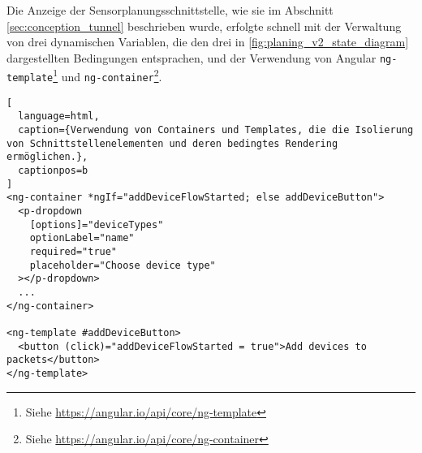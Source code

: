 Die Anzeige der Sensorplanungsschnittstelle, wie sie im Abschnitt \ref{sec:conception_tunnel} beschrieben wurde, erfolgte schnell mit der Verwaltung von drei dynamischen Variablen, die den drei in \ref{fig:planing_v2_state_diagram} dargestellten Bedingungen entsprachen, und der Verwendung von Angular \lstinline{ng-template}\footnote{Siehe \href{https://angular.io/api/core/ng-template}{https://angular.io/api/core/ng-template}} und \lstinline{ng-container}\footnote{Siehe \href{https://angular.io/api/core/ng-container}{https://angular.io/api/core/ng-container}}.

\begin{lstlisting}[
  language=html,
  caption={Verwendung von Containers und Templates, die die Isolierung von Schnittstellenelementen und deren bedingtes Rendering ermöglichen.},
  captionpos=b
]
<ng-container *ngIf="addDeviceFlowStarted; else addDeviceButton">
  <p-dropdown
    [options]="deviceTypes"
    optionLabel="name"
    required="true"
    placeholder="Choose device type"
  ></p-dropdown>
  ...
</ng-container>

<ng-template #addDeviceButton>
  <button (click)="addDeviceFlowStarted = true">Add devices to packets</button>
</ng-template>
\end{lstlisting}

